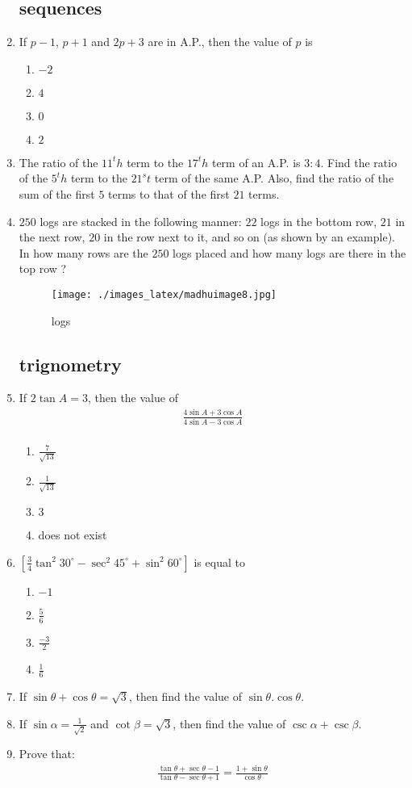 \documentclass{article}
\begin{document}
\begin{enumerate}
\subsection{sequences}
\item If $p-1$, $p+1$ and $2p+3$ are in A.P., then the value of $p$ is 
\begin{enumerate} 
\item $-2$
\item $4$
\item $0$
\item $2$ 
\end{enumerate}
\item The ratio of the $11^th$ term to the $17^th$ term of an A.P. is $3:4$. Find the ratio of the $5^th$ term to the $21^st$ term of the same A.P. Also, find the ratio of the sum of the first $5$ terms to that of the first $21$ terms.
\item $250$ logs are stacked in the following manner: $22$ logs in the bottom row, $21$ in the next row, $20$ in the row next to it, and so on (as shown by an example). In how many rows are the $250$ logs placed and how many logs are there in the top row ?  
\begin{figure}[H] 
\centering
\texttt{[image: ./images\_latex/madhuimage8.jpg]}
\label{fig:fig8}
\caption{logs}
\end{figure}
\subsection{trignometry}
\item If $2\tan A=3$, then the value of  
\begin{align}
\frac{4\sin A+3\cos A} {4 \sin A-3\cos A} \\
\end{align} 
\begin{enumerate}
\item $\frac{7}{\sqrt{13}}$ 
\item $\frac{1}{\sqrt{13}}$
\item $3$ 
\item does not exist
\end{enumerate}
\item $\left[\frac{3}{4} \tan^2 30^\circ - \sec^2 45^\circ + \sin^2 60^\circ\right]$ is equal to
\begin{enumerate}  
\item $-1$ 
\item $\frac{5}{6}$ 
\item $\frac{-3}{2}$  
\item $\frac{1}{6}$ 
\end{enumerate}
\item If $\sin \theta + \cos \theta=\sqrt{3}$, then find the value of $\sin \theta . \cos \theta$. 
\item If $\sin \alpha = \frac{1}{\sqrt{2}}$ and $\cot \beta = \sqrt{3}$, then find the value of $\csc \alpha + \csc \beta$.
\item Prove that:  
\begin{align}
\frac{\tan \theta + \sec \theta - 1} {\tan \theta - \sec \theta + 1} = \frac{1 +\sin \theta} {\cos \theta} 
\end{align}
\end{enumerate}	
\end{document}
